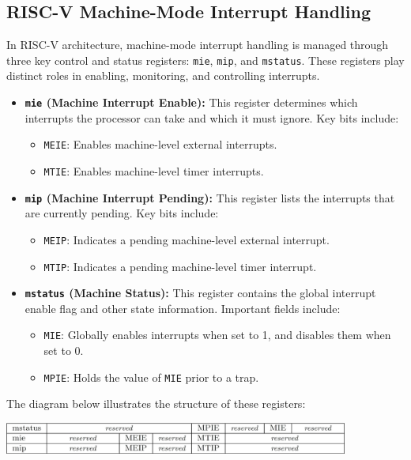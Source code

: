 \subsection{RISC-V Machine-Mode Interrupt Handling}

In RISC-V architecture, machine-mode interrupt handling is managed through three key control and status registers: \texttt{mie}, \texttt{mip}, and \texttt{mstatus}. These registers play distinct roles in enabling, monitoring, and controlling interrupts.

\begin{itemize}
    \item \textbf{\texttt{mie} (Machine Interrupt Enable):} 
    This register determines which interrupts the processor can take and which it must ignore. Key bits include:
    \begin{itemize}
        \item \texttt{MEIE}: Enables machine-level external interrupts.
        \item \texttt{MTIE}: Enables machine-level timer interrupts.
    \end{itemize}

    \item \textbf{\texttt{mip} (Machine Interrupt Pending):} 
    This register lists the interrupts that are currently pending. Key bits include:
    \begin{itemize}
        \item \texttt{MEIP}: Indicates a pending machine-level external interrupt.
        \item \texttt{MTIP}: Indicates a pending machine-level timer interrupt.
    \end{itemize}

    \item \textbf{\texttt{mstatus} (Machine Status):} 
    This register contains the global interrupt enable flag and other state information. Important fields include:
    \begin{itemize}
        \item \texttt{MIE}: Globally enables interrupts when set to 1, and disables them when set to 0.
        \item \texttt{MPIE}: Holds the value of \texttt{MIE} prior to a trap.
    \end{itemize}
\end{itemize}

The diagram below illustrates the structure of these registers:
\begin{center}
    \includegraphics[width=0.85\textwidth]{chapters/chapter2d/images/int_handl_reg.png}
\end{center}

